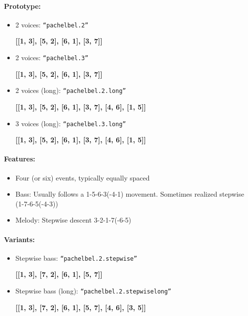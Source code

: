 ﻿\documentclass[11pt, openany]{article}
\begin{document}
\begin{itemize}
\paragraph{Prototype:}
\begin{itemize}
\item 2 voices: \texttt{“pachelbel.2”}
	\begin{center}
	\textbf{[[1, 3], [5, 2], [6, 1], [3, 7]]}
	\end{center}
\item 2 voices: \texttt{“pachelbel.3”}
	\begin{center}
	\textbf{[[1, 3], [5, 2], [6, 1], [3, 7]]}
	\end{center}
\item 2 voices (long): \texttt{“pachelbel.2.long”}
	\begin{center}
	\textbf{[[1, 3], [5, 2], [6, 1], [3, 7], [4, 6], [1, 5]]}
	\end{center}
\item 3 voices (long): \texttt{“pachelbel.3.long”}
	\begin{center}
	\textbf{[[1, 3], [5, 2], [6, 1], [3, 7], [4, 6], [1, 5]]}
	\end{center}
\end{itemize}

\paragraph{Features:}
\begin{itemize}
\item Four (or six) events, typically equally spaced
\item Bass: Usually follows a 1-5-6-3(-4-1) movement. Sometimes realized stepwise (1-7-6-5(-4-3))
\item Melody: Stepwise descent 3-2-1-7(-6-5)
\end{itemize}

\paragraph{Variants:}
\begin{itemize}
\item Stepwise bass: \texttt{“pachelbel.2.stepwise”}
	\begin{center}
	\textbf{[[1, 3], [7, 2], [6, 1], [5, 7]]}
	\end{center}
\item Stepwise bass (long): \texttt{“pachelbel.2.stepwiselong”}
	\begin{center}
	\textbf{[[1, 3], [7, 2], [6, 1], [5, 7], [4, 6], [3, 5]]}
	\end{center}
\end{itemize}


\end{itemize}
\end{document}
